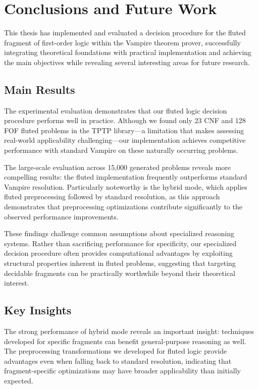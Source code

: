\newpage\pagestyle{conclusions}
\chapter*{Conclusions and Future Work}\label{chap:conclusions}

This thesis has implemented and evaluated a decision procedure for the fluted fragment of first-order logic within the Vampire theorem prover, successfully integrating theoretical foundations with practical implementation and achieving the main objectives while revealing several interesting areas for future research.

\section*{Main Results}

The experimental evaluation demonstrates that our fluted logic decision procedure performs well in practice. Although we found only 23 CNF and 128 FOF fluted problems in the TPTP library—a limitation that makes assessing real-world applicability challenging—our implementation achieves competitive performance with standard Vampire on these naturally occurring problems.

The large-scale evaluation across 15,000 generated problems reveals more compelling results: the fluted implementation frequently outperforms standard Vampire resolution. Particularly noteworthy is the hybrid mode, which applies fluted preprocessing followed by standard resolution, as this approach demonstrates that preprocessing optimizations contribute significantly to the observed performance improvements.

These findings challenge common assumptions about specialized reasoning systems. Rather than sacrificing performance for specificity, our specialized decision procedure often provides computational advantages by exploiting structural properties inherent in fluted problems, suggesting that targeting decidable fragments can be practically worthwhile beyond their theoretical interest.

\section*{Key Insights}

The strong performance of hybrid mode reveals an important insight: techniques developed for specific fragments can benefit general-purpose reasoning as well. The preprocessing transformations we developed for fluted logic provide advantages even when falling back to standard resolution, indicating that fragment-specific optimizations may have broader applicability than initially expected.

